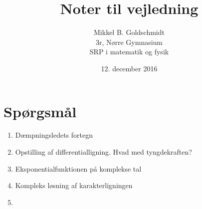 \documentclass[11pt,a4paper]{article}
\author{Mikkel B. Goldschmidt \\ 3r, Nørre Gymnasium \\ SRP i matematik og fysik}
\title{Noter til vejledning}
\date{12. december 2016}
\begin{document}
\maketitle
\section*{Spørgsmål}
\begin{enumerate}
	\item Dæmpningsledets fortegn
	\item Opstilling af differentialligning. Hvad med tyngdekraften?
	\item Eksponentialfunktionen på komplekse tal
	\item Kompleks løsning af karakterligningen
	
	\item 
\end{enumerate}
\end{document}
